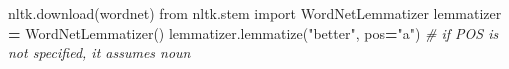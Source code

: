 \documentclass[
]{book}
\newenvironment{Shaded}{\begin{snugshade}}{\end{snugshade}}
\newcommand{\CommentTok}[1]{\textcolor[rgb]{0.56,0.35,0.01}{\textit{#1}}}
\newcommand{\ImportTok}[1]{#1}
\newcommand{\NormalTok}[1]{#1}
\newcommand{\OperatorTok}[1]{\textcolor[rgb]{0.81,0.36,0.00}{\textbf{#1}}}
\newcommand{\StringTok}[1]{\textcolor[rgb]{0.31,0.60,0.02}{#1}}
\begin{document}
\begin{Shaded}
\begin{Highlighting}[]
\NormalTok{nltk.download(}\StringTok{\textquotesingle{}wordnet\textquotesingle{}}\NormalTok{)}
\ImportTok{from}\NormalTok{ nltk.stem }\ImportTok{import}\NormalTok{ WordNetLemmatizer}
\NormalTok{lemmatizer }\OperatorTok{=}\NormalTok{ WordNetLemmatizer()}
\NormalTok{lemmatizer.lemmatize(}\StringTok{"better"}\NormalTok{, pos}\OperatorTok{=}\StringTok{"a"}\NormalTok{) }\CommentTok{\# if POS is not specified, it assumes noun}
\end{Highlighting}
\end{Shaded}


  
\end{document}

